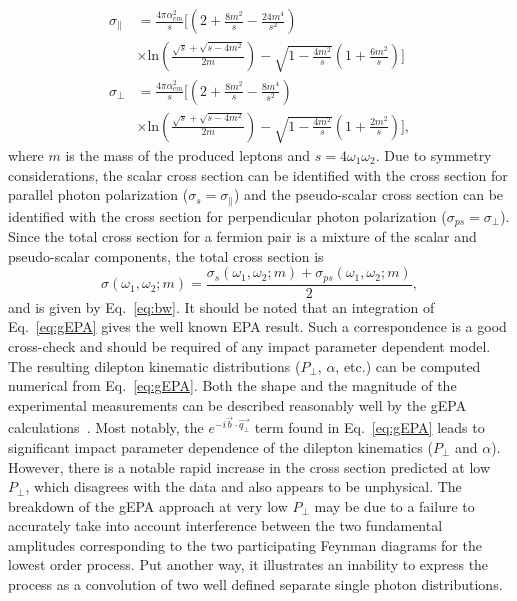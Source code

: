 \documentclass[twocolumn,epjc3]{svjour3}\sloppy
\begin{document}
\begin{equation}
    \label{eq:bw_pol}
    \begin{aligned}
    \sigma_{\parallel} & = \frac{4\pi \alpha_{em}^{2}}{s} \bigg[\left(2+\frac{8m^{2}}{s} - \frac{24m^{4}}{s^{2}}\right) \\ 
    & \times \text{ln}\left(\frac{\sqrt{s}+\sqrt{s-4m^{2}}}{2m}\right) -\sqrt{1-\frac{4m^{2}}{s}}\left(1+\frac{6m^{2}}{s}\right)\bigg]\\
    \sigma_{\perp} & = \frac{4\pi \alpha_{em}^{2}}{s} \bigg[\left(2+\frac{8m^{2}}{s} - \frac{8m^{4}}{s^{2}}\right) \\
    & \times\text{ln}\left(\frac{\sqrt{s}+\sqrt{s-4m^{2}}}{2m}\right) -\sqrt{1-\frac{4m^{2}}{s}}\left(1+\frac{2m^{2}}{s}\right)\bigg],
    \end{aligned}
\end{equation}
where $m$ is the mass of the produced leptons and $s=4\omega_1\omega_2$. Due to symmetry considerations, the scalar cross section can be identified with the cross section for parallel photon polarization ($\sigma_s=\sigma_\parallel$) and the pseudo-scalar cross section can be identified with the cross section for perpendicular photon polarization ($\sigma_{ps}=\sigma_\perp$). 
Since the total cross section for a fermion pair is a mixture of the scalar and pseudo-scalar components, the total cross section is 
\begin{equation}
    \sigma(\omega_1, \omega_2; m) = \frac{\sigma_{s}(\omega_1, \omega_2; m) + \sigma_{ps}(\omega_1, \omega_2; m)}{2},
\end{equation}
and is given by Eq.~\ref{eq:bw}. It should be noted that an integration of Eq.~\ref{eq:gEPA} gives the well known EPA result. Such a correspondence is a good cross-check and should be required of any impact parameter dependent model. The resulting dilepton kinematic distributions ($P_\perp$, $\alpha$, etc.) can be computed numerical from Eq.~\ref{eq:gEPA}. 
Both the shape and the magnitude of the experimental measurements can be described reasonably well by the gEPA calculations~\cite{zhaInitialTransversemomentumBroadening2020b}. 
Most notably, the $e^{-i\vec{b}\cdot\vec{q_\perp}}$ term found in Eq.~\ref{eq:gEPA} leads to significant impact parameter dependence of the dilepton kinematics ($P_\perp$ and $\alpha$).
However, there is a notable rapid increase in the cross section predicted at low $P_\perp$, which disagrees with the data and also appears to be unphysical. 
The breakdown of the gEPA approach at very low $P_\perp$ may be due to a failure to accurately take into account interference between the two fundamental amplitudes corresponding to the two participating Feynman diagrams for the lowest order process. Put another way, it illustrates an inability to express the process as a convolution of two well defined separate single photon distributions.
\end{document}
